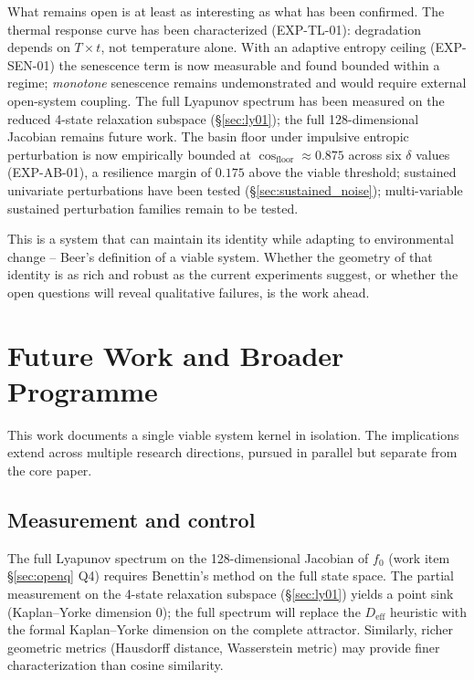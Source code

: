 \documentclass[11pt, a4paper]{article}
\begin{document}
What remains open is at least as interesting as what has been confirmed.
The thermal response curve has been characterized (EXP-TL-01): degradation
depends on $T \times t$, not temperature alone.
With an adaptive entropy ceiling (EXP-SEN-01) the senescence term is now
measurable and found bounded within a regime; \emph{monotone} senescence
remains undemonstrated and would require external open-system coupling.
The full Lyapunov spectrum has been measured on the reduced 4-state
relaxation subspace (\S\ref{sec:ly01}); the full 128-dimensional Jacobian
remains future work.
The basin floor under impulsive entropic perturbation is now empirically
bounded at $\cos_\text{floor} \approx 0.875$ across six $\delta$ values
(EXP-AB-01), a resilience margin of $0.175$ above the viable threshold;
sustained univariate perturbations have been tested (\S\ref{sec:sustained_noise});
multi-variable sustained perturbation families remain to be tested.

This is a system that can maintain its identity while adapting to
environmental change -- Beer's definition of a viable system.
Whether the geometry of that identity is as rich and robust as the
current experiments suggest, or whether the open questions will reveal
qualitative failures, is the work ahead.


\section{Future Work and Broader Programme}
\label{sec:future}

This work documents a single viable system kernel in isolation.
The implications extend across multiple research directions, pursued
in parallel but separate from the core paper.

\subsection*{Measurement and control}

The full Lyapunov spectrum on the 128-dimensional Jacobian of $f_0$
(work item \S\ref{sec:openq} Q4) requires Benettin's method on the full
state space. The partial measurement on the 4-state relaxation subspace
(\S\ref{sec:ly01}) yields a point sink (Kaplan--Yorke dimension $0$);
the full spectrum will replace the $D_\text{eff}$ heuristic with the
formal Kaplan--Yorke dimension on the complete attractor.
Similarly, richer geometric metrics (Hausdorff distance, Wasserstein metric)
may provide finer characterization than cosine similarity.
\end{document}
